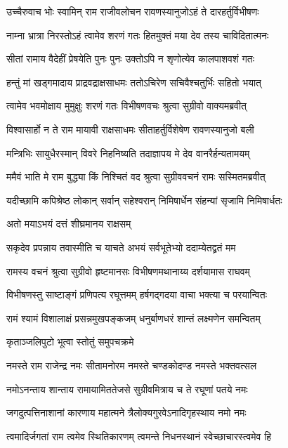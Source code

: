 \twolineshloka
{उच्चैरुवाच भोः स्वामिन् राम राजीवलोचन}
{रावणस्यानुजोऽहं ते दारहर्तुर्विभीषणः} %

\twolineshloka
{नाम्ना भ्रात्रा निरस्तोऽहं त्वामेव शरणं गतः}
{हितमुक्तं मया देव तस्य चाविदितात्मनः} %

\twolineshloka
{सीतां रामाय वैदेहीं प्रेषयेति पुनः पुनः}
{उक्तोऽपि न शृणोत्येव कालपाशवशं गतः} %

\twolineshloka
{हन्तुं मां खड्गमादाय प्राद्रवद्राक्षसाधमः}
{ततोऽचिरेण सचिवैश्चतुर्भिः सहितो भयात्} %

\twolineshloka
{त्वामेव भवमोक्षाय मुमुक्षुः शरणं गतः}
{विभीषणवचः श्रुत्वा सुग्रीवो वाक्यमब्रवीत्} %

\twolineshloka
{विश्वासार्हो न ते राम मायावी राक्षसाधमः}
{सीताहर्तुर्विशेषेण रावणस्यानुजो बली} %

\twolineshloka
{मन्त्रिभिः सायुधैरस्मान् विवरे निहनिष्यति}
{तदाज्ञापय मे देव वानरैर्हन्यतामयम्} %

\twolineshloka
{ममैवं भाति मे राम बुद्ध्या किं निश्चितं वद}
{श्रुत्वा सुग्रीववचनं रामः सस्मितमब्रवीत्} %

\twolineshloka
{यदीच्छामि कपिश्रेष्ठ लोकान् सर्वान् सहेश्वरान्}
{निमिषार्धेन संहन्यां सृजामि निमिषार्धतः} %

\onelineshloka
{अतो मयाऽभयं दत्तं शीघ्रमानय राक्षसम्} %

\twolineshloka
{सकृदेव प्रपन्नाय तवास्मीति च याचते}
{अभयं सर्वभूतेभ्यो ददाम्येतद्व्रतं मम} %

\twolineshloka
{रामस्य वचनं श्रुत्वा सुग्रीवो हृष्टमानसः}
{विभीषणमथानाय्य दर्शयामास राघवम्} %

\twolineshloka
{विभीषणस्तु साष्टाङ्गं प्रणिपत्य रघूत्तमम्}
{हर्षगद्गदया वाचा भक्त्या च परयान्वितः} %

\twolineshloka
{रामं श्यामं विशालाक्षं प्रसन्नमुखपङ्कजम्}
{धनुर्बाणधरं शान्तं लक्ष्मणेन समन्वितम्} %

\onelineshloka
{कृताञ्जलिपुटो भूत्वा स्तोतुं समुपचक्रमे} %



\twolineshloka
{नमस्ते राम राजेन्द्र नमः सीतामनोरम}
{नमस्ते चण्डकोदण्ड नमस्ते भक्तवत्सल} %

\twolineshloka
{नमोऽनन्ताय शान्ताय रामायामिततेजसे}
{सुग्रीवमित्राय च ते रघूणां पतये नमः} %

\twolineshloka
{जगदुत्पत्तिनाशानां कारणाय महात्मने}
{त्रैलोक्यगुरवेऽनादिगृहस्थाय नमो नमः} %

\twolineshloka
{त्वमादिर्जगतां राम त्वमेव स्थितिकारणम्}
{त्वमन्ते निधनस्थानं स्वेच्छाचारस्त्वमेव हि} %

